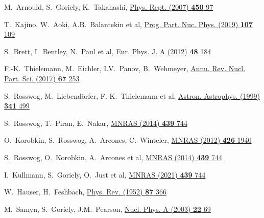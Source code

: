 \renewcommand{\refname}{Список литературы}
\begin{thebibliography}{9}

M.~Arnould, S.~Goriely, K.~Takahashi,
\href{https://doi.org/10.1016/j.physrep.2007.06.002}
  {Phys. Rept. (2007) \textbf{450} 97}

T.~Kajino, W.~Aoki, A.B.~Balantekin et al,
\href{https://doi.org/10.1016/j.ppnp.2019.02.008}
  {Prog. Part. Nuc. Phys. (2019) \textbf{107} 109}

S.~Brett, I.~Bentley, N.~Paul et al,
\href{https://doi.org/10.1140/epja/i2012-12184-4}
  {Eur. Phys. J. A (2012) \textbf{48} 184}

F.-K.~Thielemann, M.~Eichler, I.V.~Panov, B.~Wehmeyer,
\href{https://doi.org/10.1146/annurev-nucl-101916-123246}
  {Annu. Rev. Nucl. Part. Sci. (2017) \textbf{67} 253}

S.~Rosswog, M.~Liebendörfer, F.-K.~Thielemann et al,
\href{https://doi.org/10.48550/arXiv.astro-ph/9811367}
  {Astron. Astrophys. (1999) \textbf{341} 499}

S.~Rosswog, T.~Piran, E.~Nakar,
\href{https://doi.org/10.1093/mnras/stt2502}{MNRAS (2014) \textbf{439} 744}

O.~Korobkin, S.~Rosswog, A.~Arcones, C.~Winteler,
\href{https://doi.org/10.1111/j.1365-2966.2012.21859.x}
  {MNRAS (2012) \textbf{426} 1940}

S.~Rosswog, O.~Korobkin, A.~Arcones et al,
\href{https://doi.org/10.1093/mnras/stt2502}{MNRAS (2014) \textbf{439} 744}

I.~Kullmann, S.~Goriely, O.~Just et al,
\href{https://doi.org/10.1093/mnras/stab3393}{MNRAS (2021) \textbf{439} 744}


W.~Hauser, H.~Feshbach,
\href{http://link.aps.org/doi/10.1103/PhysRev.87.366.}
  {Phys. Rev. (1952) \textbf{87} 366}

M.~Samyn, S.~Goriely, J.M.~Pearson,
\href{https://doi.org/10.1016/S0375-9474(03)01578-1}
  {Nucl. Phys. A (2003) \textbf{22} 69}


\end{thebibliography}

